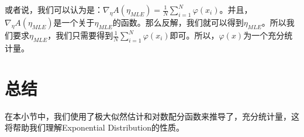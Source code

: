 \documentclass[a4paper]{article}
\begin{document}
或者说，我们可以认为是：$\nabla_{\eta}A(\eta_{MLE}) = \frac{1}{N}\sum_{i=1}^N\varphi(x_i)$。并且，$\nabla_{\eta}A(\eta_{MLE})$是一个关于$\eta_{MLE}$的函数。那么反解，我们就可以得到$\eta_{MLE}$。所以我们要求$\eta_{MLE}$，我们只需要得到$\frac{1}{N}\sum_{i=1}^N\varphi(x_i)$即可。所以，$\varphi(x)$为一个充分统计量。

\section{总结}
在本小节中，我们使用了极大似然估计和对数配分函数来推导了，充分统计量，这将帮助我们理解Exponential Distribution的性质。 
\end{document}
